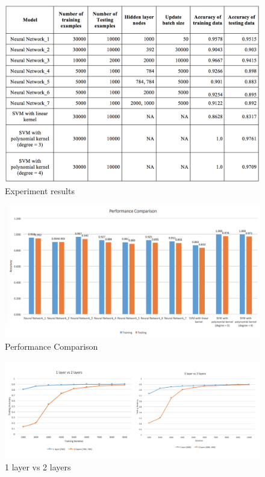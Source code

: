 \documentclass[11pt,letterpaper]{article}
\begin{document}
\begin{center}
\begin{figure}
\includegraphics[scale=0.55]{table}
    \caption{Experiment results}
      \label{results}
\end{figure}
\end{center}

\begin{center}
\begin{figure}
\includegraphics[scale=0.7]{models}
    \caption{Performance Comparison}
      \label{performance}
\end{figure}
\end{center}

\begin{center}
\begin{figure}
\includegraphics[scale=0.68]{layer_3}
    \caption{1 layer vs 2 layers}
      \label{12layer}
\end{figure}
\end{center}
\end{document}
